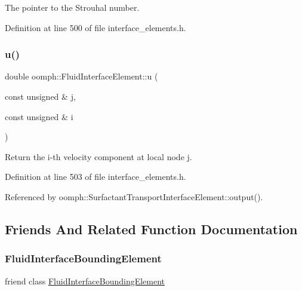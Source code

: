 The pointer to the Strouhal number. 



Definition at line 500 of file interface\+\_\+elements.\+h.

\mbox{\label{classoomph_1_1FluidInterfaceElement_a50a509413ea7f2a481678837846dd476}} 
\subsubsection{\texorpdfstring{u()}{u()}}
{\footnotesize\ttfamily double oomph\+::\+Fluid\+Interface\+Element\+::u (\begin{DoxyParamCaption}\item[{const unsigned \&}]{j,  }\item[{const unsigned \&}]{i }\end{DoxyParamCaption})\hspace{0.3cm}{\ttfamily [inline]}}



Return the i-\/th velocity component at local node j. 



Definition at line 503 of file interface\+\_\+elements.\+h.



Referenced by oomph\+::\+Surfactant\+Transport\+Interface\+Element\+::output().



\subsection{Friends And Related Function Documentation}
\mbox{\label{classoomph_1_1FluidInterfaceElement_af0eab9c2aa8fc5a5006df03ab93c015f}} 
\subsubsection{\texorpdfstring{Fluid\+Interface\+Bounding\+Element}{FluidInterfaceBoundingElement}}
{\footnotesize\ttfamily friend class \hyperlink{classoomph_1_1FluidInterfaceBoundingElement}{Fluid\+Interface\+Bounding\+Element}\hspace{0.3cm}{\ttfamily [friend]}}



